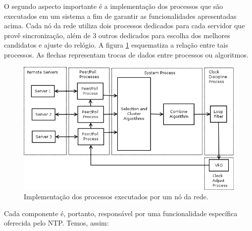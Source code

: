 O segundo aspecto importante é a implementação dos processos que são executados
em um sistema a fim de garantir as funcionalidades apresentadas acima. Cada nó
da rede utiliza dois processos dedicados para cada servidor que provê
sincronização, além de 3 outros dedicados para escolha dos melhores candidatos
e ajuste do relógio. A figura \ref{fig:modelo} esquematiza a relação entre tais
processos. As flechas representam trocas de dados entre processos ou algoritmos.
 
\FloatBarrier

\begin{figure}[h]
    
    \centering
    \includegraphics[scale=0.5]{image/ntp_implementation}
    \caption {Implementação dos processos executados por um nó da rede.}
    \label{fig:modelo}
\end{figure} 

\FloatBarrier

Cada componente é, portanto, responsável por uma funcionalidade específica
oferecida pelo NTP. Temos, assim:

